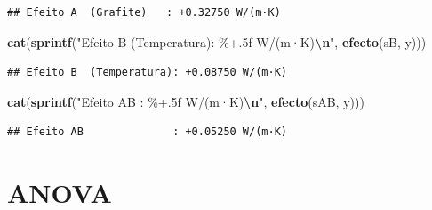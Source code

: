 \documentclass[
]{article}
\newenvironment{Shaded}{\begin{snugshade}}{\end{snugshade}}
\newcommand{\AttributeTok}[1]{\textcolor[rgb]{0.13,0.29,0.53}{#1}}
\newcommand{\FunctionTok}[1]{\textcolor[rgb]{0.13,0.29,0.53}{\textbf{#1}}}
\newcommand{\NormalTok}[1]{#1}
\newcommand{\OtherTok}[1]{\textcolor[rgb]{0.56,0.35,0.01}{#1}}
\newcommand{\SpecialCharTok}[1]{\textcolor[rgb]{0.81,0.36,0.00}{\textbf{#1}}}
\newcommand{\StringTok}[1]{\textcolor[rgb]{0.31,0.60,0.02}{#1}}
\begin{document}
\begin{verbatim}
## Efeito A  (Grafite)   : +0.32750 W/(m·K)
\end{verbatim}

\begin{Shaded}
\begin{Highlighting}[]
\FunctionTok{cat}\NormalTok{(}\FunctionTok{sprintf}\NormalTok{(}\StringTok{"Efeito B  (Temperatura): \%+.5f W/(m·K)}\SpecialCharTok{\textbackslash{}n}\StringTok{"}\NormalTok{, }\FunctionTok{efecto}\NormalTok{(sB,  y)))}
\end{Highlighting}
\end{Shaded}

\begin{verbatim}
## Efeito B  (Temperatura): +0.08750 W/(m·K)
\end{verbatim}

\begin{Shaded}
\begin{Highlighting}[]
\FunctionTok{cat}\NormalTok{(}\FunctionTok{sprintf}\NormalTok{(}\StringTok{"Efeito AB              : \%+.5f W/(m·K)}\SpecialCharTok{\textbackslash{}n}\StringTok{"}\NormalTok{, }\FunctionTok{efecto}\NormalTok{(sAB, y)))}
\end{Highlighting}
\end{Shaded}

\begin{verbatim}
## Efeito AB              : +0.05250 W/(m·K)
\end{verbatim}

\section{ANOVA}\label{anova}

\begin{Shaded}
\end{Shaded}
\end{document}
